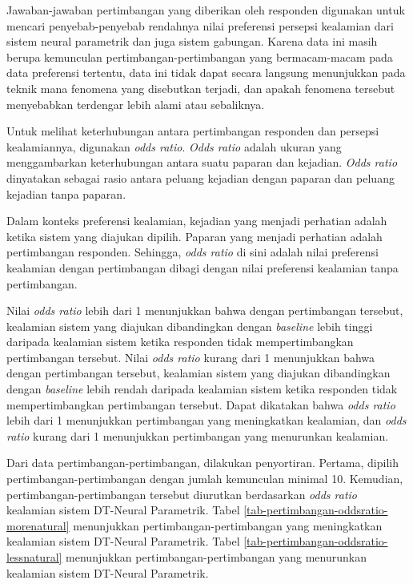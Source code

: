 Jawaban-jawaban pertimbangan yang diberikan oleh responden digunakan untuk mencari penyebab-penyebab rendahnya nilai preferensi persepsi kealamian dari sistem neural parametrik dan juga sistem gabungan. Karena data ini masih berupa kemunculan pertimbangan-pertimbangan yang bermacam-macam pada data preferensi tertentu, data ini tidak dapat secara langsung menunjukkan pada teknik mana fenomena yang disebutkan terjadi, dan apakah fenomena tersebut menyebabkan terdengar lebih alami atau sebaliknya.

Untuk melihat keterhubungan antara pertimbangan responden dan persepsi kealamiannya, digunakan \textit{odds ratio}. \textit{Odds ratio} adalah ukuran yang menggambarkan keterhubungan antara suatu paparan dan kejadian. \textit{Odds ratio} dinyatakan sebagai rasio antara peluang kejadian dengan paparan dan peluang kejadian tanpa paparan. \parencite{oddsratio}

Dalam konteks preferensi kealamian, kejadian yang menjadi perhatian adalah ketika sistem yang diajukan dipilih. Paparan yang menjadi perhatian adalah pertimbangan responden. Sehingga, \textit{odds ratio} di sini adalah nilai preferensi kealamian dengan pertimbangan dibagi dengan nilai preferensi kealamian tanpa pertimbangan.

Nilai \textit{odds ratio} lebih dari 1 menunjukkan bahwa dengan pertimbangan tersebut, kealamian sistem yang diajukan dibandingkan dengan \textit{baseline} lebih tinggi daripada kealamian sistem ketika responden tidak mempertimbangkan pertimbangan tersebut. Nilai \textit{odds ratio} kurang dari 1 menunjukkan bahwa dengan pertimbangan tersebut, kealamian sistem yang diajukan dibandingkan dengan \textit{baseline} lebih rendah daripada kealamian sistem ketika responden tidak mempertimbangkan pertimbangan tersebut. Dapat dikatakan bahwa \textit{odds ratio} lebih dari 1 menunjukkan pertimbangan yang meningkatkan kealamian, dan \textit{odds ratio} kurang dari 1 menunjukkan pertimbangan yang menurunkan kealamian.

Dari data pertimbangan-pertimbangan, dilakukan penyortiran. Pertama, dipilih pertimbangan-pertimbangan dengan jumlah kemunculan minimal 10. Kemudian, pertimbangan-pertimbangan tersebut diurutkan berdasarkan \textit{odds ratio} kealamian sistem DT-Neural Parametrik. Tabel \ref{tab-pertimbangan-oddsratio-morenatural} menunjukkan pertimbangan-pertimbangan yang meningkatkan kealamian sistem DT-Neural Parametrik. Tabel \ref{tab-pertimbangan-oddsratio-lessnatural} menunjukkan pertimbangan-pertimbangan yang menurunkan kealamian sistem DT-Neural Parametrik.

